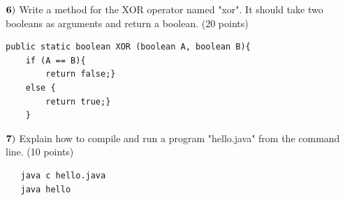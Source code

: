 \documentclass{article}
\begin{document}
  $\bf{6)}$ Write a method for the XOR operator named "xor".  It should take two booleans as arguments and return a boolean.  (20 points)
   \vspace{0.5cm}
   \begin{verbatim}
public static boolean XOR (boolean A, boolean B){
    if (A == B){
        return false;}
    else {
        return true;}
    }

  \end{verbatim}
   
   $\bf{7)}$ Explain how to compile and run a program "hello.java" from the command line.  (10 points)
   \begin{verbatim}
   java c hello.java
   java hello
  \end{verbatim}
  


  
  
  
    

 
\end{document}
